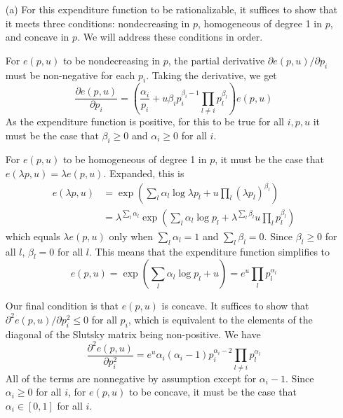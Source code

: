 \documentclass[12pt]{article}
\begin{document}
\begin{itemize}
    \item[(a)] For this expenditure function to be rationalizable, it suffices to show that it meets three conditions: nondecreasing in $p$, homogeneous of degree 1 in $p$, and concave in $p$. We will address these conditions in order.

    \smallskip

    For $e(p,u)$ to be nondecreasing in $p$, the partial derivative $\partial e(p,u) / \partial p_i$ must be non-negative for each $p_i$. Taking the derivative, we get
    \[
    \frac{\partial e(p,u)}{\partial p_i} = \left(\frac{\alpha_i}{p_i} + u\beta_i p_i^{\beta_i - 1} \prod_{l\ne i} p_l^{\beta_l} \right) e(p,u)
    \]
    As the expenditure function is positive, for this to be true for all $i,p,u$ it must be the case that $\beta_i \ge 0$ and $\alpha_i \ge 0$ for all $i$.

    \smallskip

    For $e(p,u)$ to be homogeneous of degree 1 in $p$, it must be the case that $e(\lambda p,u) = \lambda e(p,u)$. Expanded, this is
    \begin{align*}
        e(\lambda p,u) &= \exp\left(\sum_l \alpha_l \log \lambda p_l + u\prod_l (\lambda p_l)^{\beta_l}  \right) \\
        &= \lambda^{\sum_l \alpha_l} \exp\left(\sum_l \alpha_l \log p_l + \lambda^{\sum_l \beta_l} u\prod_l p_l^{\beta_l}  \right)
    \end{align*}
    which equals $\lambda e(p,u)$ only when $\sum_l \alpha_l = 1$ and $\sum_l \beta_l = 0$. Since $\beta_l \ge 0$ for all $l$, $\beta_l = 0$ for all $l$. This means that the expenditure function simplifies to
    \[
    e(p,u) = \exp\left(\sum_l \alpha_l \log p_l + u \right) = e^u \prod_l p_l^{\alpha_l}
    \]

    \smallskip

    Our final condition is that $e(p,u)$ is concave. It suffices to show that $\partial^2 e(p,u) / \partial p_i^2 \le 0$ for all $p_i$, which is equivalent to the elements of the diagonal of the Slutsky matrix being non-positive. We have
    \[
    \frac{\partial^2 e(p,u)}{\partial p_i^2} = e^u \alpha_i (\alpha_i - 1) p_i^{\alpha_i - 2} \prod_{l \ne i} p_l^{\alpha_l}
    \]
    All of the terms are nonnegative by assumption except for $\alpha_i - 1$. Since $\alpha_i \ge 0$ for all $i$, for $e(p,u)$ to be concave, it must be the case that $\alpha_i \in [0,1]$ for all $i$.

    \smallskip


\end{itemize}
\end{document}

